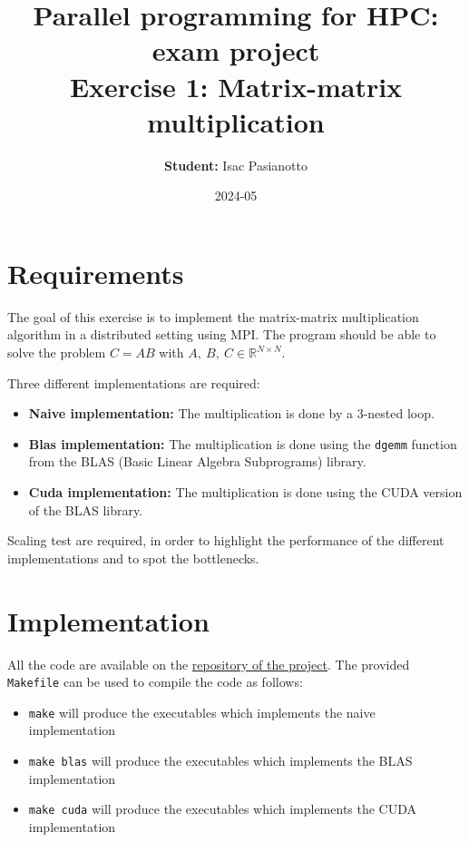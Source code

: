 \documentclass{article}
\title{Parallel programming for HPC: exam project\\ Exercise 1: Matrix-matrix multiplication}
\author{\textbf{Student:} Isac Pasianotto}
\date{2024-05}
\begin{document}
    \maketitle

    \section{Requirements}
    The goal of this exercise is to implement the matrix-matrix multiplication algorithm in a distributed setting using MPI.
    The program should be able to solve the problem $C = AB$ with $A,\ B,\ C \in \mathbb{R}^{N\times N}$.

    \noindent Three different implementations are required:

    \begin{itemize}
        \itemsep0em
        \item \textbf{Naive implementation:}  The multiplication is done by a 3-nested loop.
        \item \textbf{Blas implementation:} The multiplication is done using the \texttt{dgemm} function from the BLAS (Basic Linear Algebra Subprograms) library.
        \item \textbf{Cuda implementation:} The multiplication is done using the CUDA version of the BLAS library.
    \end{itemize}

    Scaling test are required, in order to highlight the performance of the different implementations and to spot the bottlenecks.

    \section{Implementation}

    All the code are available on the \href{https://github.com/IsacPasianotto/Parallel-Programming-HPC/tree/main/mat-mat-mul}{repository of the project}.
    The provided \texttt{Makefile} can be used to compile the code as follows:
    \begin{itemize}
        \itemsep0em
        \item \texttt{make} will produce the executables which implements the naive implementation
        \item \texttt{make blas} will produce the executables which implements the BLAS implementation
        \item \texttt{make cuda} will produce the executables which implements the CUDA implementation
    \end{itemize}
\end{document}
